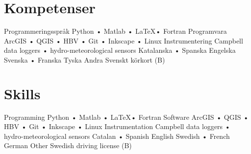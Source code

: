 \ifswedish
    \section{Kompetenser}
        \skill
            {Programmeringsspråk}
            {Python • Matlab • \LaTeX • Fortran}
        \skill
            {Programvara}
            {ArcGIS • QGIS • HBV • Git • Inkscape • Linux}
        \skill
            {Instrumentering}
            {Campbell data loggers • hydro-meteorological sensors}
        \languages
            {Katalanska • Spanska}
            {Engelska}
            {Svenska • Franska}
            {Tyska}
        \skill
            {Andra}
            {Svenskt körkort (B)}
\else
    \section{Skills}
        \skill
            {Programming}
            {Python • Matlab • \LaTeX • Fortran}
        \skill
            {Software}
            {ArcGIS • QGIS • HBV • Git • Inkscape • Linux}
        \skill
            {Instrumentation}
            {Campbell data loggers • hydro-meteorological sensors}
        \languages
            {Catalan • Spanish}
            {English}
            {Swedish • French}
            {German}
        \skill
            {Other}
            {Swedish driving license (B)}
\fi
